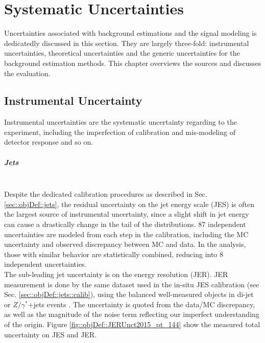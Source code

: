 \chapter{Systematic Uncertainties}  \label{sec::Uncertainties}
Uncertainties associated with background estimations and the signal modeling is dedicatedly discussed in this section.
They are largely three-fold: instrumental uncertainties, theoretical uncertainties and the generic uncertainties for the background estimation methods. 
This chapter overviews the sources and discusses the evaluation. \\

\section{Instrumental Uncertainty}
Instrumental uncertainties are the systematic uncertainty regarding to the experiment, including the imperfection of calibration and mis-modeling of detector response and so on.
  
\paragraph{Jets} \mbox{} \\
Despite the dedicated calibration procedures as described in Sec. \ref{sec::objDef::jets}, 
the residual uncertainty on the jet energy scale (JES) is often the largest source of instrumental uncertainty, 
since a slight shift in jet energy can cause a drastically change in the tail of the distributions.
87 independent uncertainties are modeled from each step in the calibration, including the MC uncertainty and observed discrepancy between MC and data.
In the analysis, those with similar behavior are statistically combined, reducing into 8 independent uncertainties. \\

The sub-leading jet uncertainty is on the energy resolution (JER). 
JER measurement is done by the same dataset used in the in-situ JES calibration (see Sec. \ref{sec::objDef::jets::calib}), using the balanced well-measured objects in di-jet or $Z/\gamma^*$+jets events \cite{144_JESmeas_2015data}. The uncertainty is quoted from the data/MC discrepancy, as well as the magnitude of the noise term reflecting our imperfect understanding of the origin. Figure \ref{fig::objDef::JERUnct2015_pt_144} show the measured total uncertainty on JES and JER. \\

